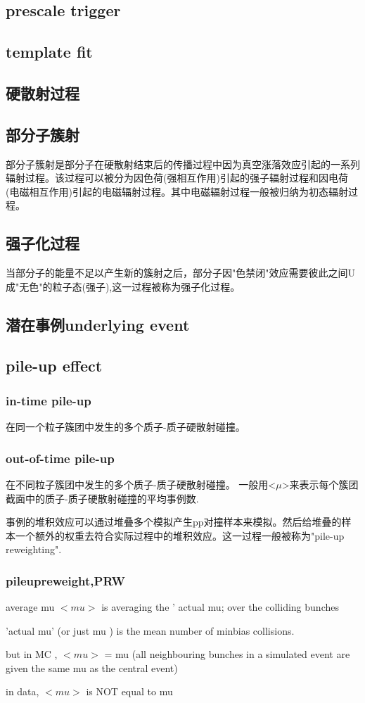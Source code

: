 \documentclass{ctexart}
\begin{document}
\subsection{prescale trigger}
\subsection{template fit}
\subsection{硬散射过程}

\subsection{部分子簇射}
部分子簇射是部分子在硬散射结束后的传播过程中因为真空涨落效应引起的一系列辐射过程。该过程可以被分为因色荷(强相互作用)引起的强子辐射过程和因电荷(电磁相互作用)引起的电磁辐射过程。其中电磁辐射过程一般被归纳为初态辐射过程。
\subsection{强子化过程}
当部分子的能量不足以产生新的簇射之后，部分子因"色禁闭"效应需要彼此之间U成"无色"的粒子态(强子),这一过程被称为强子化过程。
\subsection{潜在事例underlying event}
\subsection{pile-up effect}
\subsubsection{in-time pile-up}
在同一个粒子簇团中发生的多个质子-质子硬散射碰撞。
\subsubsection{out-of-time pile-up}
在不同粒子簇团中发生的多个质子-质子硬散射碰撞。
一般用<$\mu$>来表示每个簇团截面中的质子-质子硬散射碰撞的平均事例数.\par
事例的堆积效应可以通过堆叠多个模拟产生pp对撞样本来模拟。然后给堆叠的样本一个额外的权重去符合实际过程中的堆积效应。这一过程一般被称为"pile-up reweighting".
\subsubsection{pileupreweight,PRW}
average mu $<mu>$ is averaging the ' actual mu; over the colliding bunches \par
'actual mu' (or just mu ) is the mean number of minbias collisions.\par
but in MC , $<mu>$ = mu (all neighbouring bunches in a simulated event are given the same mu as the central event)\par
in data, $<mu>$ is NOT equal to mu 
\end{document}
